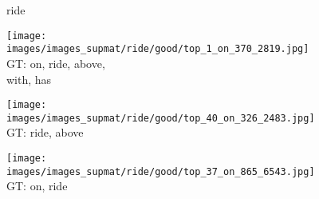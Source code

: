 \documentclass[10pt,twocolumn,letterpaper]{article}
\begin{document}
\begin{figure*}[t]
	\begin{minipage}[t]{0.005\textwidth}
    	\centering
    	\vspace{-8.5ex}
    	\begin{turn}{90}
    	ride
    	\end{turn}
    	\vspace{2ex}
    \end{minipage}
    \hspace{0.01\textwidth}
    \begin{minipage}[t]{0.18\textwidth}
    	\centering
       	\texttt{[image: images/images\_supmat/ride/good/top\_1\_on\_370\_2819.jpg]}\\
       	\vspace{0.3ex}
       	GT: on, ride, above,\\
       	with, has
       	\vspace{2ex}
    \end{minipage}
    \hspace{0.005\textwidth}
    \begin{minipage}[t]{0.18\textwidth}
    	\centering
       	\texttt{[image: images/images\_supmat/ride/good/top\_40\_on\_326\_2483.jpg]}\\
       	\vspace{0.3ex}
       	GT: ride, above
       	\vspace{0.2ex}
    \end{minipage}
    \hspace{0.005\textwidth}
    \begin{minipage}[t]{0.18\textwidth}
    	\centering
       	\texttt{[image: images/images\_supmat/ride/good/top\_37\_on\_865\_6543.jpg]}\\
       	\vspace{0.3ex}
       	GT: on, ride
       	\vspace{0.2ex}
    \end{minipage}
    \hspace{0.005\textwidth}  

\end{figure*}
\end{document}

